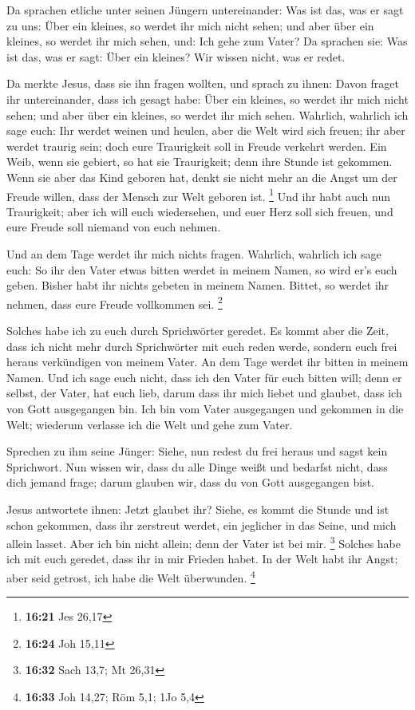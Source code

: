  Da sprachen etliche unter seinen Jüngern untereinander:
Was ist das, was er sagt zu uns: Über ein kleines, so werdet ihr mich
nicht sehen; und aber über ein kleines, so werdet ihr mich sehen, und:
Ich gehe zum Vater?  Da sprachen sie: Was ist das, was er
sagt: Über ein kleines? Wir wissen nicht, was er redet.

 Da merkte Jesus, dass sie ihn fragen wollten, und sprach
zu ihnen: Davon fraget ihr untereinander, dass ich gesagt habe: Über ein
kleines, so werdet ihr mich nicht sehen; und aber über ein kleines, so
werdet ihr mich sehen.  Wahrlich, wahrlich ich sage euch:
Ihr werdet weinen und heulen, aber die Welt wird sich freuen; ihr aber
werdet traurig sein; doch eure Traurigkeit soll in Freude verkehrt
werden.  Ein Weib, wenn sie gebiert, so hat sie
Traurigkeit; denn ihre Stunde ist gekommen. Wenn sie aber das Kind
geboren hat, denkt sie nicht mehr an die Angst um der Freude willen,
dass der Mensch zur Welt geboren ist. \footnote{\textbf{16:21} Jes 26,17}
 Und ihr habt auch nun Traurigkeit; aber ich will euch
wiedersehen, und euer Herz soll sich freuen, und eure Freude soll
niemand von euch nehmen.

 Und an dem Tage werdet ihr mich nichts fragen. Wahrlich,
wahrlich ich sage euch: So ihr den Vater etwas bitten werdet in meinem
Namen, so wird er's euch geben.  Bisher habt ihr nichts
gebeten in meinem Namen. Bittet, so werdet ihr nehmen, dass eure Freude
vollkommen sei. \footnote{\textbf{16:24} Joh 15,11}

 Solches habe ich zu euch durch Sprichwörter geredet. Es
kommt aber die Zeit, dass ich nicht mehr durch Sprichwörter mit euch
reden werde, sondern euch frei heraus verkündigen von meinem Vater.
 An dem Tage werdet ihr bitten in meinem Namen. Und ich
sage euch nicht, dass ich den Vater für euch bitten will; 
denn er selbst, der Vater, hat euch lieb, darum dass ihr mich liebet und
glaubet, dass ich von Gott ausgegangen bin.  Ich bin vom
Vater ausgegangen und gekommen in die Welt; wiederum verlasse ich die
Welt und gehe zum Vater.

 Sprechen zu ihm seine Jünger: Siehe, nun redest du frei
heraus und sagst kein Sprichwort.  Nun wissen wir, dass du
alle Dinge weißt und bedarfst nicht, dass dich jemand frage; darum
glauben wir, dass du von Gott ausgegangen bist.

 Jesus antwortete ihnen: Jetzt glaubet ihr? 
Siehe, es kommt die Stunde und ist schon gekommen, dass ihr zerstreut
werdet, ein jeglicher in das Seine, und mich allein lasset. Aber ich bin
nicht allein; denn der Vater ist bei mir. \footnote{\textbf{16:32} Sach
  13,7; Mt 26,31}  Solches habe ich mit euch geredet, dass
ihr in mir Frieden habet. In der Welt habt ihr Angst; aber seid getrost,
ich habe die Welt überwunden. \footnote{\textbf{16:33} Joh 14,27; Röm
  5,1; 1Jo 5,4}

